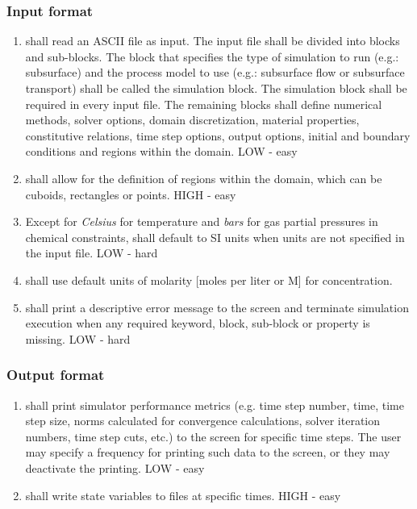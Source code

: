 \subsubsection{Input format}
\begin{enumerate}
	\item \pft shall read an ASCII file as input. The input file shall be divided into blocks and sub-blocks. The block that specifies the type of simulation to run (e.g.: subsurface) and the process model to use (e.g.: subsurface flow or subsurface transport) shall be called the simulation block. The simulation block shall be required in every input file. The remaining blocks shall define numerical methods, solver options, domain discretization, material properties, constitutive relations, time step options, output options, initial and boundary conditions and regions within the domain. \label{inputFile} LOW - easy
	\item \pft shall allow for the definition of regions within the domain, which can be cuboids, rectangles or points. \label{inputRegions} HIGH - easy
	\item Except for \textit{Celsius} for temperature and \textit{bars} for gas partial pressures in chemical constraints, \pft shall default to SI units when units are not specified in the input file. \label{inputUnitsValues} LOW - hard
	\item \pft shall use default units of molarity [moles per liter or M] for concentration.
	\item \pft shall print a descriptive error message to the screen and terminate simulation execution when any required keyword, block, sub-block or property is missing. \label{inputErrors} LOW - hard
\end{enumerate}

\subsubsection{Output format}
\begin{enumerate}[resume]
	\item \pft shall print simulator performance metrics (e.g. time step number, time, time step size, norms calculated for convergence calculations, solver iteration numbers, time step cuts, etc.) to the screen for specific time steps. The user may specify a frequency for printing such data to the screen, or they may deactivate the printing. \label{outputPrintScreen} LOW - easy
	\item \pft shall write state variables to files at specific times. \label{outputSpecs} HIGH - easy
\end{enumerate}

